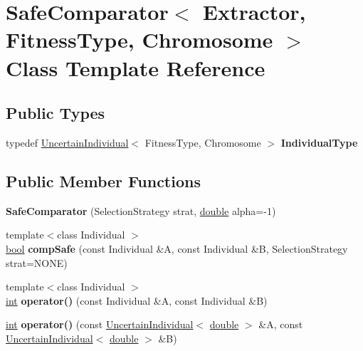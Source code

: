 \hypertarget{classSafeComparator}{}\section{Safe\+Comparator$<$ Extractor, Fitness\+Type, Chromosome $>$ Class Template Reference}
\label{classSafeComparator}
\subsection*{Public Types}
\begin{DoxyCompactItemize}
\item 
typedef \hyperlink{classUncertainIndividual}{Uncertain\+Individual}$<$ Fitness\+Type, Chromosome $>$ {\bfseries Individual\+Type}\hypertarget{classSafeComparator_abd55300822a89ab2c7671e60c0fb4b9d}{}\label{classSafeComparator_abd55300822a89ab2c7671e60c0fb4b9d}

\end{DoxyCompactItemize}
\subsection*{Public Member Functions}
\begin{DoxyCompactItemize}
\item 
{\bfseries Safe\+Comparator} (Selection\+Strategy strat, \hyperlink{classdouble}{double} alpha=-\/1)\hypertarget{classSafeComparator_a595218b156e45ac19bcaed6f2fb69713}{}\label{classSafeComparator_a595218b156e45ac19bcaed6f2fb69713}

\item 
{\footnotesize template$<$class Individual $>$ }\\\hyperlink{classbool}{bool} {\bfseries comp\+Safe} (const Individual \&A, const Individual \&B, Selection\+Strategy strat=N\+O\+NE)\hypertarget{classSafeComparator_ac7782d6b39053ffee1c5c11683641073}{}\label{classSafeComparator_ac7782d6b39053ffee1c5c11683641073}

\item 
{\footnotesize template$<$class Individual $>$ }\\\hyperlink{classint}{int} {\bfseries operator()} (const Individual \&A, const Individual \&B)\hypertarget{classSafeComparator_a4f322e368af7149cfa60d20be1340a8b}{}\label{classSafeComparator_a4f322e368af7149cfa60d20be1340a8b}

\item 
\hyperlink{classint}{int} {\bfseries operator()} (const \hyperlink{classUncertainIndividual}{Uncertain\+Individual}$<$ \hyperlink{classdouble}{double} $>$ \&A, const \hyperlink{classUncertainIndividual}{Uncertain\+Individual}$<$ \hyperlink{classdouble}{double} $>$ \&B)\hypertarget{classSafeComparator_a7637498af802b1f642caaabf64547190}{}\label{classSafeComparator_a7637498af802b1f642caaabf64547190}

\end{DoxyCompactItemize}
